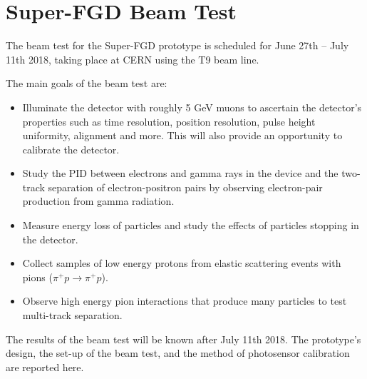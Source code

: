 \documentclass[aps,pra,12pt,notitlepage,tightenlines]{revtex4-1}
\begin{document}
\section{Super-FGD Beam Test}
\label{sec:sfgd}
The beam test for the Super-FGD prototype is scheduled for June 27th -- July 11th 2018, taking place at CERN using the T9 beam line.

The main goals of the beam test are:
\begin{itemize}
 \item Illuminate the detector with roughly 5 GeV muons to ascertain the detector's properties such as time resolution, position resolution, pulse height uniformity, alignment and more. This will also provide an opportunity to calibrate the detector.
 \item Study the PID between electrons and gamma rays in the device and the two-track separation of electron-positron pairs by observing electron-pair production from gamma radiation.
 \item Measure energy loss of particles and study the effects of particles stopping in the detector.
 \item Collect samples of low energy protons from elastic scattering events with pions ($\pi^+ p \rightarrow \pi^+ p$).
 \item Observe high energy pion interactions that produce many particles to test multi-track separation.
\end{itemize}

The results of the beam test will be known after July 11th 2018. The prototype's design, the set-up of the beam test, and the method of photosensor calibration are reported here.
\end{document}
